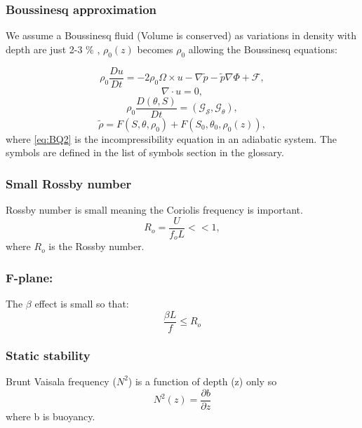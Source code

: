 \subsubsection*{Boussinesq approximation}

We assume a Boussinesq fluid (Volume is conserved) as variations in density with depth are just 2-3 \% , $ \rho _0 (z)$ becomes $ \rho _0$ allowing the Boussinesq equations:

\begin{equation}
\rho _0 \frac{Du}{Dt} = -2 \rho _0 \Omega \times u - \nabla \tilde{p} - \tilde{p} \nabla \Phi + \mathcal{F},
\label{eq:BQ1}
\end{equation}
\begin{equation}
\nabla \cdot u = 0,
\label{eq:BQ2}
\end{equation}
\begin{equation}
\rho _0 \frac{D (\theta, S)}{Dt} = ( \mathcal{G_S}, \mathcal{G_{\theta}}),
\label{eq:BQ3}
\end{equation}
\begin{equation}
\tilde{\rho} = F ( S, \theta, \rho _0 ) + F(S_0, \theta _0, \rho _0 (z)),
\label{eq:BQ4}
\end{equation}
where \ref{eq:BQ2} is the \gls{incompressibility} equation in an adiabatic system.  The symbols are defined in the list of symbols section in the glossary.
\subsubsection*{Small Rossby number}
Rossby number is small meaning the Coriolis frequency is important.
\begin{equation}
R_o=\frac{U}{f_o L} << 1 ,
\end{equation}
where $R_o$ is the Rossby number.
\subsubsection*{F-plane:}
The $\beta $ effect is small so that: 
\begin{equation}
\frac{\beta L}{f} \leq R_o
\end{equation}


\subsubsection*{Static stability}

\gls{Brunt Vaisala frequency} ($N^2$) is a function of depth (z) only so
\begin{equation}
N^2 (z) = \frac{\partial b}{\partial z} 
\end{equation}
where b is buoyancy.


